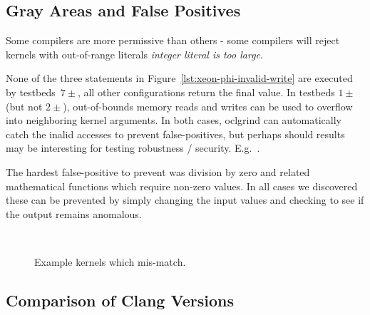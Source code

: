 \subsection{Gray Areas and False Positives}


Some compilers are more permissive than others - some compilers will reject kernels with out-of-range literals \emph{integer literal is too large}.

None of the three statements in Figure~\ref{lst:xeon-phi-invalid-write} are executed by testbeds~$7\pm$, all other configurations return the final value. In testbeds $1\pm$ (but not $2\pm$), out-of-bounds memory reads and writes can be used to overflow into neighboring kernel arguments. In both cases, oclgrind can automatically catch the inalid accesses to prevent false-positives, but perhaps should results may be interesting for testing robustness / security. E.g.~\cite{Holler2012}.

The hardest false-positive to prevent was division by zero and related mathematical functions which require non-zero values. In all cases we discovered these can be prevented by simply changing the input values and checking to see if the output remains anomalous.

\begin{figure}
  \centering %
  \\%
  \caption{Example kernels which mis-match.}%
  \label{lst:gray-areas}%
\end{figure}



\subsection{Comparison of Clang Versions}%
\label{subsec:clangs}

